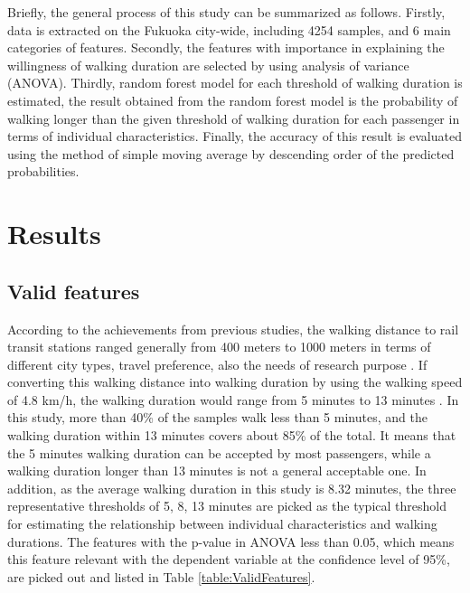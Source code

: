 \documentclass[Journal,letterpaper]{ascelike-new}
\begin{document}
%
Briefly, the general process of this study can be summarized as follows. Firstly, data is extracted on the Fukuoka city-wide, including 4254 samples, and 6 main categories of features. Secondly, the features with importance in explaining the willingness of walking duration are selected by using analysis of variance (ANOVA). Thirdly, random forest model for each threshold of walking duration is estimated, the result obtained from the random forest model is the probability of walking longer than the given threshold of walking duration for each passenger in terms of individual characteristics. Finally, the accuracy of this result is evaluated using the method of simple moving average by descending order of the predicted probabilities.

\section{Results}
%
\subsection{Valid features}
%
According to the achievements from previous studies, the walking distance to rail transit stations ranged generally from 400 meters to 1000 meters in terms of different city types, travel preference, also the needs of research purpose \cite{guerra2012half,murray1998public,o1996walking,keijer2000people,zhao2003forecasting,alshalalfah2007case}. If converting this walking distance into walking duration by using the walking speed of 4.8 km/h, the walking duration would range from 5 minutes to 13 minutes \cite{bohannon1997comfortable}. In this study, more than 40\% of the samples walk less than 5 minutes, and the walking duration within 13 minutes covers about 85\% of the total. It means that the 5 minutes walking duration can be accepted by most passengers, while a walking duration longer than 13 minutes is not a general acceptable one. In addition, as the average walking duration in this study is 8.32 minutes, the three representative thresholds of 5, 8, 13 minutes are picked as the typical threshold for estimating the relationship between individual characteristics and walking durations. The features with the p-value in ANOVA less than 0.05, which means this feature relevant with the dependent variable at the confidence level of 95\%, are picked out and listed in Table \ref{table:ValidFeatures}.
\end{document}
